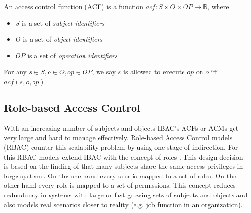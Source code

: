 \documentclass[twoside, openright, 12pt]{book}
\begin{document}
\begin{definition}
An access control function (ACF) is a function ${acf}: S \times O \times OP \rightarrow \mathbb{B}$, where
\vspace{-2mm}
\begin{itemize}
\item $S$ is a set of \textit{subject identifiers}
\item $O$ is a set of \textit{object identifiers}
\item $OP$ is a set of \textit{operation identifiers}
\end{itemize} 
\vspace{-2mm}
For any $s \in S, o \in O, op \in OP$, we say $s$ is allowed to execute $op$ on $o$ iff $acf(s,o,op)$.
\end{definition}



\subsection{Role-based Access Control}
\label{RBAC}
With an increasing number of subjects and objects IBAC's ACFs or ACMs get very large and hard to manage effectively.
Role-based Access Control models (RBAC) counter this scalability problem by using one stage of indirection.
For this RBAC models extend IBAC with the concept of roles \citep{Sandhu96}.
This design decision is based on the finding of \cite{Sandhu96} that many subjects share the same access privileges in large systems.
On the one hand every user is mapped to a set of roles.
On the other hand every role is mapped to a set of permissions.
This concept reduces redundancy in systems with large or fast growing sets of subjects and objects and also models real scenarios closer to reality (e.g. job function in an organization).
\end{document}
